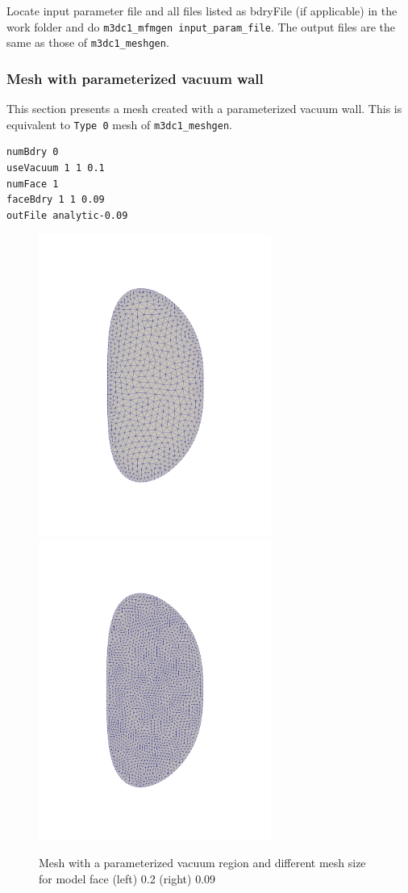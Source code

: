 Locate input parameter file and all files listed as bdryFile (if applicable) in the work folder and do \texttt{m3dc1\_mfmgen input\_param\_file}. The output files are the same as those of \texttt{m3dc1\_meshgen}.

\subsubsection{Mesh with parameterized vacuum wall}

This section presents a mesh created with a parameterized vacuum wall. This is equivalent to \texttt{Type 0} mesh of \texttt{m3dc1\_meshgen}.

\begin{verbatim}
numBdry 0
useVacuum 1 1 0.1
numFace 1
faceBdry 1 1 0.09
outFile analytic-0.09
\end{verbatim}

\begin{figure}
\centering
\includegraphics[width=3in]{./figures/meshgen-analytic-20pts-05.pdf}
\includegraphics[width=3in]{./figures/meshgen-analytic-20pts-09.pdf}
\caption{Mesh with a parameterized vacuum region and different mesh size for model face (left) 0.2 (right) 0.09}
\label{fig:analytic-mesh}
\end{figure}

